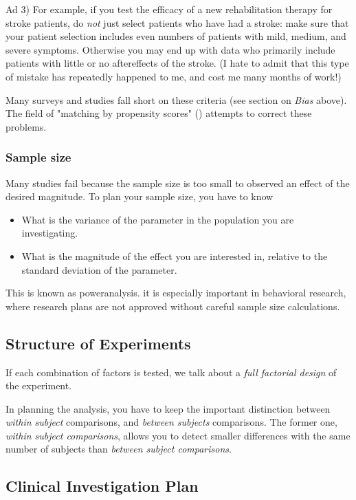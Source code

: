 Ad 3) For example, if you test the efficacy of a new rehabilitation therapy for stroke patients, do \emph{not} just select patients who have had a stroke: make sure that your patient selection includes even numbers of patients with mild, medium, and severe symptoms. Otherwise you may end up with data who primarily include patients with little or no aftereffects of the stroke. (I hate to admit that this type of mistake has repeatedly happened to me, and cost me many months of work!)

Many surveys and studies fall short on these criteria (see section on \emph{Bias} above). The field of "matching by propensity scores" (\cite{Rosenbaum1983}) attempts to correct these problems.

\subsubsection{Sample size}
Many studies fail because the sample size is too small to observed an effect of the desired magnitude. To plan your sample size, you have to know
\begin{itemize}
  \item What is the variance of the parameter in the population you are investigating.
  \item What is the magnitude of the effect you are interested in, relative to the standard deviation of the parameter.
\end{itemize}

This is known as \gls{poweranalysis}. it is especially important in behavioral research, where research plans are not approved without careful sample size calculations.

\subsection{Structure of Experiments}

If each combination of factors is tested, we talk about a \emph{full factorial design} of the experiment.

In planning the analysis, you have to keep the important distinction between \emph{within subject} comparisons, and \emph{between subjects} comparisons. The former one, \emph{within subject comparisons}, allows you to detect smaller differences with the same number of subjects than \emph{between subject comparisons}.

\subsection{Clinical Investigation Plan}

